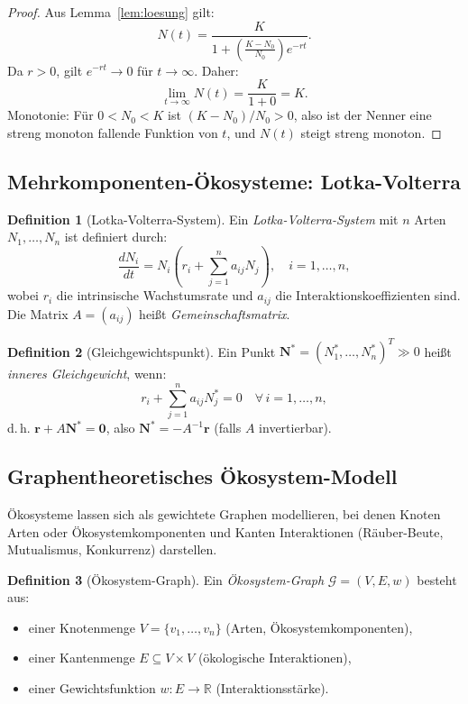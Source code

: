 ﻿\documentclass[a4paper,12pt]{article}
\theoremstyle{definition}
\newtheorem{definition}{Definition}
\begin{document}
\begin{proof}
	Aus Lemma~\ref{lem:loesung} gilt:
	\[
	N(t) = \frac{K}{1 + \left(\frac{K-N_0}{N_0}\right)e^{-rt}}.
	\]
	Da $r > 0$, gilt $e^{-rt} \to 0$ für $t \to \infty$. Daher:
	\[
	\lim_{t\to\infty} N(t) = \frac{K}{1 + 0} = K.
	\]
	Monotonie: Für $0 < N_0 < K$ ist $(K - N_0)/N_0 > 0$, also ist der Nenner eine streng monoton fallende Funktion von $t$, und $N(t)$ steigt streng monoton. \qedhere
\end{proof}

\subsection{Mehrkomponenten-Ökosysteme: Lotka-Volterra}

\begin{definition}[Lotka-Volterra-System]
	Ein \emph{Lotka-Volterra-System} mit $n$ Arten $N_1, \ldots, N_n$ ist definiert durch:
	\[
	\frac{dN_i}{dt} = N_i \left( r_i + \sum_{j=1}^{n} a_{ij} N_j \right), \quad i = 1, \ldots, n,
	\]
	wobei $r_i$ die intrinsische Wachstumsrate und $a_{ij}$ die Interaktionskoeffizienten sind. Die Matrix $A = (a_{ij})$ heißt \emph{Gemeinschaftsmatrix}.
\end{definition}

\begin{definition}[Gleichgewichtspunkt]
	Ein Punkt $\mathbf{N}^* = (N_1^*, \ldots, N_n^*)^T \gg 0$ heißt \emph{inneres Gleichgewicht}, wenn:
	\[
	r_i + \sum_{j=1}^{n} a_{ij} N_j^* = 0 \quad \forall\, i = 1, \ldots, n,
	\]
	d.\,h. $\mathbf{r} + A\mathbf{N}^* = \mathbf{0}$, also $\mathbf{N}^* = -A^{-1}\mathbf{r}$ (falls $A$ invertierbar).
\end{definition}

\subsection{Graphentheoretisches Ökosystem-Modell}

Ökosysteme lassen sich als gewichtete Graphen modellieren, bei denen Knoten Arten oder Ökosystemkomponenten und Kanten Interaktionen (Räuber-Beute, Mutualismus, Konkurrenz) darstellen.

\begin{definition}[Ökosystem-Graph]
	Ein \emph{Ökosystem-Graph} $\mathcal{G} = (V, E, w)$ besteht aus:
	\begin{itemize}
		\item einer Knotenmenge $V = \{v_1, \ldots, v_n\}$ (Arten, Ökosystemkomponenten),
		\item einer Kantenmenge $E \subseteq V \times V$ (ökologische Interaktionen),
		\item einer Gewichtsfunktion $w: E \to \mathbb{R}$ (Interaktionsstärke).
	\end{itemize}
\end{definition}
\end{document}
